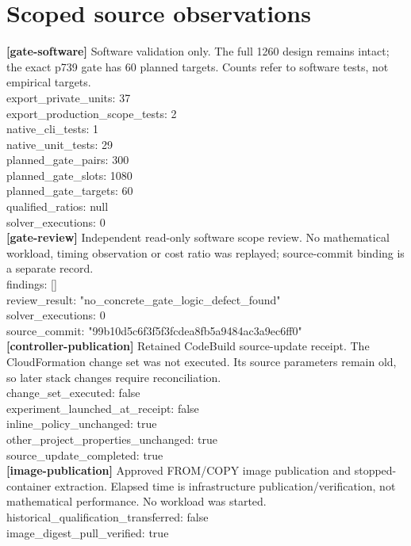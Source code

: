 \documentclass[11pt]{article}
\begin{document}
\section*{Scoped source observations}
\textbf{[gate-software]} Software validation only. The full 1260 design remains intact; the exact p739 gate has 60 planned targets. Counts refer to software tests, not empirical targets.\\
export\_private\_units: 37\\
export\_production\_scope\_tests: 2\\
native\_cli\_tests: 1\\
native\_unit\_tests: 29\\
planned\_gate\_pairs: 300\\
planned\_gate\_slots: 1080\\
planned\_gate\_targets: 60\\
qualified\_ratios: null\\
solver\_executions: 0\\
\textbf{[gate-review]} Independent read-only software scope review. No mathematical workload, timing observation or cost ratio was replayed; source-commit binding is a separate record.\\
findings: []\\
review\_result: "no\_concrete\_gate\_logic\_defect\_found"\\
solver\_executions: 0\\
source\_commit: "99b10d5c6f3f5f3fcdea8fb5a9484ac3a9ec6ff0"\\
\textbf{[controller-publication]} Retained CodeBuild source-update receipt. The CloudFormation change set was not executed. Its source parameters remain old, so later stack changes require reconciliation.\\
change\_set\_executed: false\\
experiment\_launched\_at\_receipt: false\\
inline\_policy\_unchanged: true\\
other\_project\_properties\_unchanged: true\\
source\_update\_completed: true\\
\textbf{[image-publication]} Approved FROM/COPY image publication and stopped-container extraction. Elapsed time is infrastructure publication/verification, not mathematical performance. No workload was started.\\
historical\_qualification\_transferred: false\\
image\_digest\_pull\_verified: true\\
\end{document}
